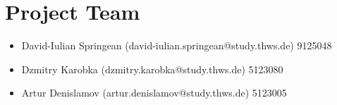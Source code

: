 \section{Project Team}

\begin{itemize}
    \item David-Iulian Springean (david-iulian.springean@study.thws.de) 9125048
    \item Dzmitry Karobka (dzmitry.karobka@study.thws.de) 5123080
    \item Artur Denislamov (artur.denislamov@study.thws.de) 5123005
\end{itemize}